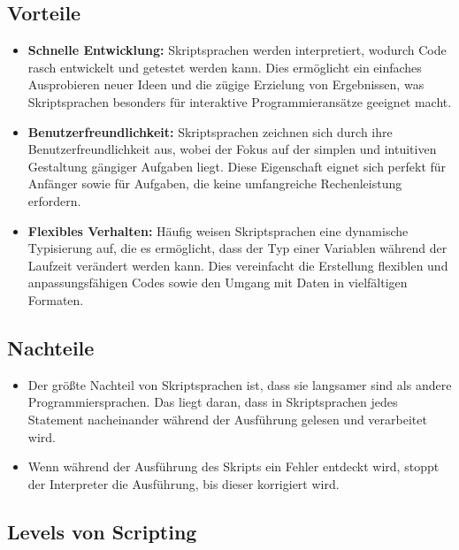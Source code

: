 \subsection*{Vorteile}

\begin{itemize}
    \item \textbf{Schnelle Entwicklung:} Skriptsprachen werden interpretiert, 
    wodurch Code rasch entwickelt und getestet werden kann. 
    Dies ermöglicht ein einfaches Ausprobieren neuer Ideen und die zügige 
    Erzielung von Ergebnissen, was Skriptsprachen besonders für interaktive 
    Programmieransätze geeignet macht.
    \item \textbf{Benutzerfreundlichkeit:} Skriptsprachen zeichnen sich durch ihre 
    Benutzerfreundlichkeit aus, wobei der Fokus auf der simplen und intuitiven 
    Gestaltung gängiger Aufgaben liegt. Diese Eigenschaft eignet sich perfekt für Anfänger 
    sowie für Aufgaben, die keine umfangreiche Rechenleistung erfordern.
    \item \textbf{Flexibles Verhalten:} Häufig weisen Skriptsprachen eine dynamische 
    Typisierung auf, die es ermöglicht, dass der Typ einer Variablen während der 
    Laufzeit verändert werden kann. Dies vereinfacht die Erstellung flexiblen und 
    anpassungsfähigen Codes sowie den Umgang mit Daten in vielfältigen Formaten.

\end{itemize}

\subsection*{Nachteile}

\begin{itemize}
    \item Der größte Nachteil von Skriptsprachen ist, dass sie langsamer sind als 
    andere Programmiersprachen. Das liegt daran, dass in Skriptsprachen jedes 
    Statement nacheinander während der Ausführung gelesen und verarbeitet wird.
    \item Wenn während der Ausführung des Skripts ein Fehler entdeckt wird, 
    stoppt der Interpreter die Ausführung, bis dieser korrigiert wird.
\end{itemize}

\subsection*{Levels von Scripting}

